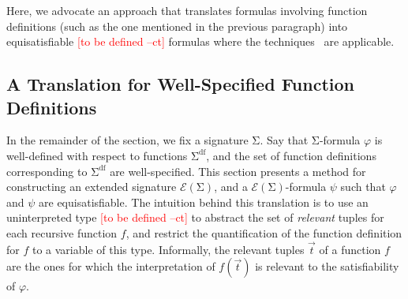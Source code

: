 \documentclass[runningheads,a4paper]{llncs}
\let\oldSigma=\Sigma
\def\Sigma{\mathrm{\oldSigma}}
\newcommand{\sfundefs}[1]{#1^\mathrm{df}}
\newcommand{\extendsig}[1]{\mathcal{E}( #1 )}
\newcommand{\rem}[1]{\textcolor{red}{[#1]}}
\newcommand{\ct}[1]{\rem{#1 --ct}}
\begin{document}
Here, we advocate an approach that translates formulas involving function definitions (such as the one mentioned in the previous paragraph)
into equisatisfiable \ct{to be defined} formulas where the techniques~\cite{GeDeM-CAV-09, ReyEtAl-1-RR-13} are applicable.

\subsection{A Translation for Well-Specified Function Definitions}
\label{sec:encoding}

In the remainder of the section, we fix a signature $\Sigma$.
Say that $\Sigma$-formula $\varphi$ is well-defined with respect to functions $\sfundefs{\Sigma}$, 
and the set of function definitions corresponding to $\sfundefs{\Sigma}$ are well-specified.
This section presents a method for constructing an extended signature $\extendsig{ \Sigma }$,
and a $\extendsig{ \Sigma }$-formula $\psi$ such that $\varphi$ and $\psi$ are equisatisfiable.
The intuition behind this translation is to use an uninterpreted type \ct{to be defined} to abstract the set of \emph{relevant} tuples for each recursive function $f$,
and restrict the quantification of the function definition for $f$ to a variable of this type.
Informally, the relevant tuples $\vec t$ of a function $f$ are the ones for which the interpretation of $f( \vec t )$ is relevant to the satisfiability of $\varphi$.
\end{document}
